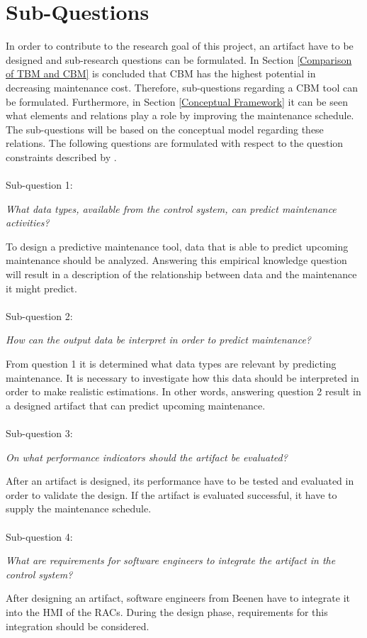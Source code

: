 \section{Sub-Questions} \label{Sub-Questions}
In order to contribute to the research goal of this project, an artifact have to be designed and sub-research questions can be formulated. In Section \ref{Comparison of TBM and CBM} is concluded that CBM has the highest potential in decreasing maintenance cost. Therefore, sub-questions regarding a CBM tool can be formulated. Furthermore, in Section \ref{Conceptual Framework} it can be seen what elements and relations play a role by improving the maintenance schedule. The sub-questions will be based on the conceptual model regarding these relations. The following questions are formulated with respect to the question constraints described by \citet{Wieringa2014}. \\ \\ 
Sub-question 1:
\begin{center}
\textit{What data types, available from the control system, can predict maintenance activities?}
\end{center}
To design a predictive maintenance tool, data that is able to predict upcoming maintenance should be analyzed. Answering this empirical knowledge question will result in a description of the relationship between data and the maintenance it might predict. \\ \\
Sub-question 2:
\begin{center}
\textit{How can the output data be interpret in order to predict maintenance?}
\end{center}
From question 1 it is determined what data types are relevant by predicting maintenance. It is necessary to investigate how this data should be interpreted in order to make realistic estimations. In other words, answering question 2 result in a designed artifact that can predict upcoming maintenance. \\ \\
Sub-question 3:
\begin{center}
\textit{On what performance indicators should the artifact be evaluated?}
\end{center}
After an artifact is designed, its performance have to be tested and evaluated in order to validate the design. If the artifact is evaluated successful, it have to supply the maintenance schedule.\\ \\
Sub-question 4:
\begin{center}
\textit{What are requirements for software engineers to integrate the artifact in the control system?}
\end{center}
After designing an artifact, software engineers from Beenen have to integrate it into the HMI of the RACs. During the design phase, requirements for this integration should be considered.



